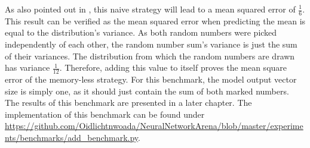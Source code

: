 \documentclass[draft,final]{vutinfth} %
\begin{document}
As also pointed out in \cite[p. 6]{UnitaryRNNs}, this naive strategy will lead to a mean squared error of $\frac{1}{6}$.
This result can be verified as the mean squared error when predicting the mean is equal to the distribution's variance.
As both random numbers were picked independently of each other, the random number sum's variance is just the sum of their variances.
The distribution from which the random numbers are drawn has variance $\frac{1}{12}$.
Therefore, adding this value to itself proves the mean square error of the memory-less strategy.
For this benchmark, the model output vector size is simply one, as it should just contain the sum of both marked numbers.
The results of this benchmark are presented in a later chapter.
The implementation of this benchmark can be found under \url{https://github.com/Oidlichtnwoada/NeuralNetworkArena/blob/master/experiments/benchmarks/add_benchmark.py}.
\end{document}
